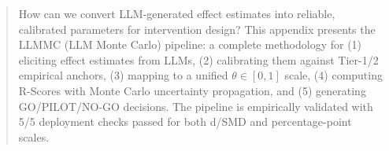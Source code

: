 
\begin{abstract}
How can we convert LLM-generated effect estimates into reliable, calibrated parameters
for intervention design? This appendix presents the LLMMC (LLM Monte Carlo) pipeline:
a complete methodology for (1) eliciting effect estimates from LLMs, (2) calibrating
them against Tier-1/2 empirical anchors, (3) mapping to a unified $\theta \in [0,1]$ scale,
(4) computing R-Scores with Monte Carlo uncertainty propagation, and (5) generating
GO/PILOT/NO-GO decisions. The pipeline is empirically validated with 5/5 deployment
checks passed for both d/SMD and percentage-point scales.
\end{abstract}


